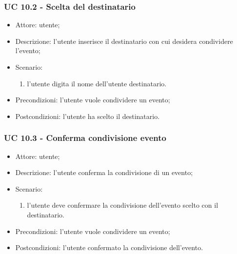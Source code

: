 \subsubsection{UC 10.2 - Scelta del destinatario} \label{sec: UC 10.2}
\begin{itemize}
    \item Attore: utente;
    \item Descrizione: l'utente inserisce il destinatario con cui desidera condividere l'evento;
    \item Scenario:
        \begin{enumerate}
        \item l'utente digita il nome dell'utente destinatario.
        \end{enumerate}
    
    \item Precondizioni: l'utente vuole condividere un evento;
    \item Postcondizioni: l'utente ha scelto il destinatario.
\end{itemize}


\subsubsection{UC 10.3 - Conferma condivisione evento} \label{sec: UC 10.3}
\begin{itemize}
    \item Attore: utente;
    \item Descrizione: l'utente conferma la condivisione di un evento;
    \item Scenario:
        \begin{enumerate}
        \item l'utente deve confermare la condivisione dell'evento scelto con il destinatario.
        \end{enumerate}
    
    \item Precondizioni: l'utente vuole condividere un evento;
    \item Postcondizioni: l'utente confermato la condivisione dell'evento.
\end{itemize}

